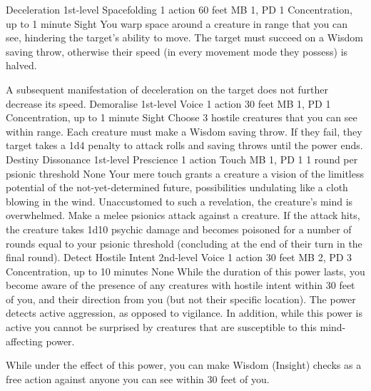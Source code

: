 \DndPowerHeader%
    {Deceleration\label{pwr:deceleration}}
    {1st-level Spacefolding}
    {1 action}
    {60 feet}
    {MB 1, PD 1}
    {Concentration, up to 1 minute}
    {Sight}
You warp space around a creature in range
that you can see, hindering the target's ability to move.
The target must succeed on a Wisdom saving throw, otherwise
their speed (in every movement mode they possess) is halved.

A subsequent manifestation of deceleration on the target does
not further decrease its speed.
\DndPowerHeader%
    {Demoralise\label{pwr:demoralise}}
    {1st-level Voice}
    {1 action}
    {30 feet}
    {MB 1, PD 1}
    {Concentration, up to 1 minute}
    {Sight}
Choose 3 hostile creatures that you can see
within range. Each creature must make a Wisdom saving throw.
If they fail, they target takes a 1d4 penalty to attack rolls
and saving throws until the power ends.
\DndPowerHeader%
    {Destiny Dissonance\label{pwr:destiny_dissonance}}
    {1st-level Prescience}
    {1 action}
    {Touch}
    {MB 1, PD 1}
    {1 round per psionic threshold}
    {None}
Your mere touch grants a creature a vision
of the limitless potential of the not-yet-determined future,
possibilities undulating like a cloth blowing in the wind.
Unaccustomed to such a revelation, the creature's mind is
overwhelmed. Make a melee psionics attack against a creature.
If the attack hits, the creature takes 1d10 psychic damage
and becomes poisoned for a number of rounds equal to your
psionic threshold (concluding at the end of their turn
in the final round).
\DndPowerHeader%
    {Detect Hostile Intent\label{pwr:detect_hostile_intent}}
    {2nd-level Voice}
    {1 action}
    {30 feet}
    {MB 2, PD 3}
    {Concentration, up to 10 minutes}
    {None}
While the duration of this power lasts, you
become aware of the presence of any creatures with hostile
intent within 30 feet of you, and their direction from you
(but not their specific location). The power detects active
aggression, as opposed to vigilance. In addition, while this
power is active you cannot be surprised by creatures that
are susceptible to this mind-affecting power.

While under the effect of this power, you can make Wisdom
(Insight) checks as a free action against anyone you can see
within 30 feet of you.

